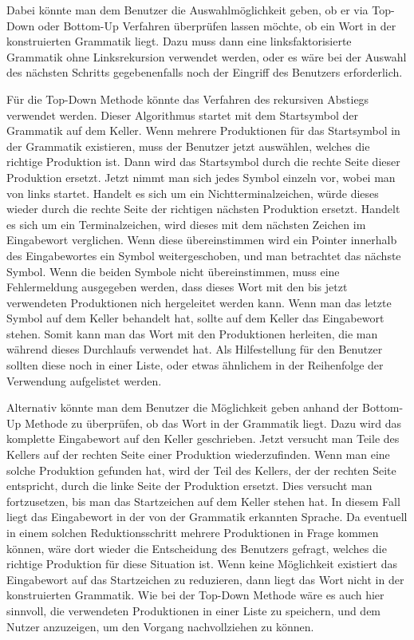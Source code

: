 Dabei könnte man dem Benutzer die Auswahlmöglichkeit geben, ob er via
Top-Down oder Bottom-Up Verfahren überprüfen lassen möchte, ob ein Wort in der
konstruierten Grammatik liegt. Dazu muss dann eine linksfaktorisierte Grammatik
ohne Linksrekursion verwendet werden, oder es wäre bei der Auswahl des nächsten
Schritts gegebenenfalls noch der Eingriff des Benutzers
erforderlich.\vspace{10pt}

Für die Top-Down Methode könnte das Verfahren des rekursiven Abstiegs verwendet
werden. Dieser Algorithmus startet mit dem Startsymbol der Grammatik auf dem
Keller. Wenn mehrere Produktionen für das Startsymbol in der Grammatik
existieren, muss der Benutzer jetzt auswählen, welches die richtige Produktion
ist. Dann wird das Startsymbol durch die rechte Seite dieser Produktion ersetzt.
Jetzt nimmt man sich jedes Symbol einzeln vor, wobei man von links startet.
Handelt es sich um ein Nichtterminalzeichen, würde dieses wieder durch die rechte
Seite der richtigen nächsten Produktion ersetzt. Handelt es sich um ein
Terminalzeichen, wird dieses mit dem nächsten Zeichen im Eingabewort verglichen.
Wenn diese übereinstimmen wird ein Pointer innerhalb des Eingabewortes ein Symbol
weitergeschoben, und man betrachtet das nächste Symbol. Wenn die beiden Symbole
nicht übereinstimmen, muss eine Fehlermeldung ausgegeben werden, dass dieses Wort
mit den bis jetzt verwendeten Produktionen nich hergeleitet werden kann. Wenn man
das letzte Symbol auf dem Keller behandelt hat, sollte auf dem Keller das
Eingabewort stehen. Somit kann man das Wort mit den Produktionen herleiten, die
man während dieses Durchlaufs verwendet hat. Als Hilfestellung für den Benutzer
sollten diese noch in einer Liste, oder etwas ähnlichem in der Reihenfolge der
Verwendung aufgelistet werden.\vspace{10pt}

Alternativ könnte man dem Benutzer die Möglichkeit geben anhand der Bot\-tom-Up
Methode zu überprüfen, ob das Wort in der Grammatik liegt. Dazu wird das
komplette Eingabewort auf den Keller geschrieben. Jetzt versucht man Teile des
Kellers auf der rechten Seite einer Produktion wiederzufinden. Wenn man eine
solche Produktion gefunden hat, wird der Teil des Kellers, der der rechten Seite
entspricht, durch die linke Seite der Produktion ersetzt. Dies versucht man
fortzusetzen, bis man das Startzeichen auf dem Keller stehen hat. In diesem Fall
liegt das Eingabewort in der von der Grammatik erkannten Sprache. Da eventuell in
einem solchen Reduktionsschritt mehrere Produktionen in Frage kommen können, wäre
dort wieder die Entscheidung des Benutzers gefragt, welches die richtige
Produktion für diese Situation ist. Wenn keine Möglichkeit existiert das
Eingabewort auf das Startzeichen zu reduzieren, dann liegt das Wort nicht in der
konstruierten Grammatik. Wie bei der Top-Down Methode wäre es auch hier sinnvoll,
die verwendeten Produktionen in einer Liste zu speichern, und dem Nutzer
anzuzeigen, um den Vorgang nachvollziehen zu können.\vspace{10pt}

